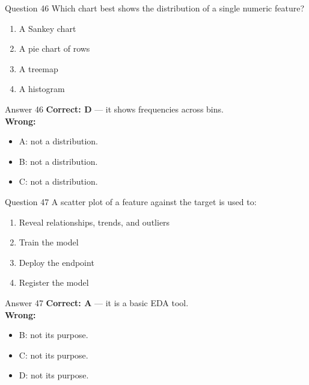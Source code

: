 \documentclass[aspectratio=169,11pt]{beamer}
\begin{document}
\begin{frame}{Question 46}
Which chart best shows the distribution of a single numeric feature?
\begin{enumerate}[label=\Alph*.]
\item A Sankey chart
\item A pie chart of rows
\item A treemap
\item A histogram
\end{enumerate}
\end{frame}
\begin{frame}{Answer 46}
\textbf{Correct: D} --- it shows frequencies across bins.\\
\vspace{0.5em}
\textbf{Wrong:}
\begin{itemize}
\item A: not a distribution.
\item B: not a distribution.
\item C: not a distribution.
\end{itemize}
\end{frame}

\begin{frame}{Question 47}
A scatter plot of a feature against the target is used to:
\begin{enumerate}[label=\Alph*.]
\item Reveal relationships, trends, and outliers
\item Train the model
\item Deploy the endpoint
\item Register the model
\end{enumerate}
\end{frame}
\begin{frame}{Answer 47}
\textbf{Correct: A} --- it is a basic EDA tool.\\
\vspace{0.5em}
\textbf{Wrong:}
\begin{itemize}
\item B: not its purpose.
\item C: not its purpose.
\item D: not its purpose.
\end{itemize}
\end{frame}
\end{document}
